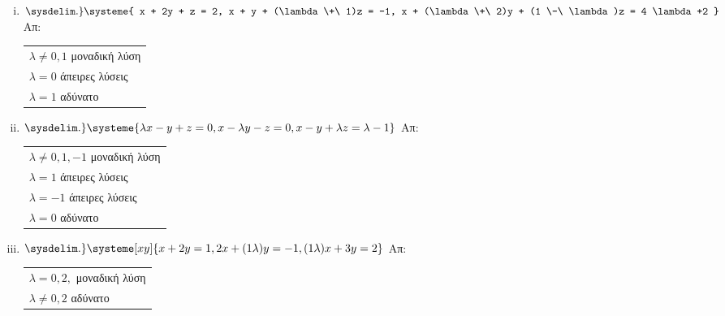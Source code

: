 \documentclass[a4paper,table]{report}
\begin{document}
\begin{enumerate}
\begin{enumerate}[i)]
\item $ \sysdelim.\} \systeme{
  x + 2y + z = 2, 
  x + y + (\lambda  \+\ 1)z = -1, 
  x + (\lambda  \+\ 2)y + (1 \-\ \lambda)z = 4 \lambda +2
} $ \hfill Απ: \begin{tabular}{l}
  $ \lambda \neq 0, 1 $ μοναδική λύση \\
  $ \lambda = 0 $ άπειρες λύσεις \\
  $ \lambda = 1 $ αδύνατο 
\end{tabular} 

\item $ \sysdelim.\} \systeme{
  \lambda x - y + z = 0,
  x - \lambda y - z = 0, 
  x - y + \lambda z = \lambda - 1
} $ \hfill Απ: \begin{tabular}{l}
  $ \lambda \neq 0, 1, -1 $ μοναδική λύση \\
  $ \lambda = 1$ άπειρες λύσεις \\
  $ \lambda = -1 $ άπειρες λύσεις \\
  $ \lambda = 0 $ αδύνατο
\end{tabular} 

\item $ \sysdelim.\} \systeme[xy]{
  x + 2y = 1,
  2x+(1 \- \lambda)y = -1, 
  (1 \- \lambda)x + 3y = 2
} $ \hfill Απ: \begin{tabular}{l}
  $ \lambda = 0, 2, $ μοναδική λύση \\
  $ \lambda \neq 0, 2 $ αδύνατο \\
\end{tabular} 

  \end{enumerate}

\end{enumerate}
\end{document}

